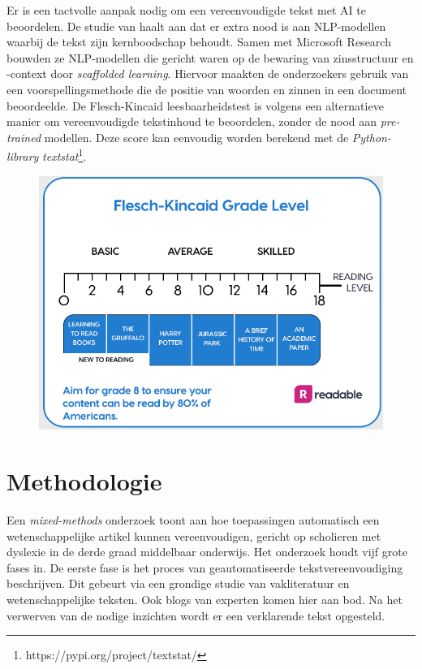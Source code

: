 Er is een tactvolle aanpak nodig om een vereenvoudigde tekst met AI te beoordelen. De studie van \textcite{Swayamdipta2019} haalt aan dat er extra nood is aan NLP-modellen waarbij de tekst zijn kernboodschap behoudt. Samen met Microsoft Research bouwden ze NLP-modellen die gericht waren op de bewaring van zinsstructuur en -context door \emph{scaffolded learning}. Hiervoor maakten de onderzoekers gebruik van een voorspellingsmethode die de positie van woorden en zinnen in een document beoordeelde. De Flesch-Kincaid leesbaarheidstest is volgens \newline \textcite{Readable2021} een alternatieve manier om vereenvoudigde tekstinhoud te beoordelen, zonder de nood aan \textit{pre-trained} modellen. Deze score kan eenvoudig worden berekend met de \textit{Python-library} \textit{textstat}\footnote{https://pypi.org/project/textstat/}. 

\begin{figure}
	\includegraphics[width=\linewidth]{img/Screenshot_302.png}
	\caption{\autocite{Readable2021}}
\end{figure}

\section{Methodologie}%
\label{sec:methodologie}
Een \textit{mixed-methods} onderzoek toont aan hoe toepassingen automatisch een wetenschappelijke artikel kunnen vereenvoudigen, gericht op scholieren met dyslexie in de derde graad middelbaar onderwijs. Het onderzoek houdt vijf grote fases in. De eerste fase is het proces van geautomatiseerde tekstvereenvoudiging beschrijven. Dit gebeurt via een grondige studie van vakliteratuur en wetenschappelijke teksten. Ook blogs van experten komen hier aan bod. Na het verwerven van de nodige inzichten wordt er een verklarende tekst opgesteld.

